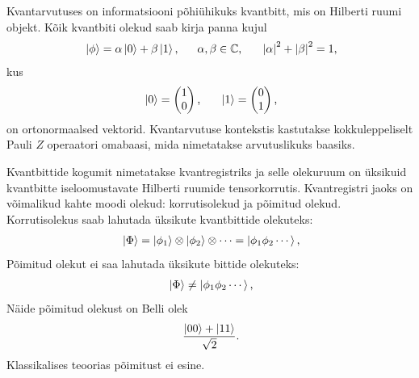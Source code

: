 \documentclass[12pt]{report}
\def\abs#1{\left|#1\right|}
\def\ket#1{\left|#1\right>}
\begin{document}
Kvantarvutuses on informatsiooni põhiühikuks kvantbitt, mis on Hilberti ruumi objekt.
Kõik kvantbiti olekud saab kirja panna kujul
\begin{align}
    \ket{\phi} = \alpha \ket{0} + \beta \ket{1} \rlap{,}
    \qquad \alpha, \beta \in \mathbb{C} \rlap{,}
    \qquad \abs{\alpha}^2 + \abs{\beta}^2 = 1 \rlap{,}
\end{align}
kus
\begin{align}\label{eq:compbasis}
    \ket{0} = \begin{pmatrix}
        1 \\
        0 \\
    \end{pmatrix} \rlap{,}
    \qquad
    \ket{1} = \begin{pmatrix}
        0 \\
        1 \\
    \end{pmatrix} \rlap{,}
\end{align}
on ortonormaalsed vektorid.
Kvantarvutuse kontekstis kastutakse kokkuleppeliselt Pauli \(Z\) operaatori omabaasi, mida nimetatakse arvutuslikuks baasiks.

Kvantbittide kogumit nimetatakse kvantregistriks ja selle olekuruum on üksikuid kvantbitte iseloomustavate Hilberti ruumide tensorkorrutis.
Kvantregistri jaoks on võimalikud kahte moodi olekud: korrutisolekud ja põimitud olekud.
Korrutisolekus saab lahutada üksikute kvantbittide olekuteks:
\begin{align}
    \ket{\Phi}
    = \ket{\phi_1} \otimes \ket{\phi_2} \otimes \cdots
    = \ket{\phi_1 \phi_2 \cdots} \rlap{,}
\end{align}
Põimitud olekut ei saa lahutada üksikute bittide olekuteks:
\begin{align}
    \ket{\Phi}
    \ne \ket{\phi_1 \phi_2 \cdots} \rlap{,}
\end{align}
Näide põimitud olekust on Belli olek
\begin{align}
    \frac{\ket{00} + \ket{11}}{\sqrt 2} \rlap{.}
\end{align}
Klassikalises teoorias põimitust ei esine.
\end{document}
